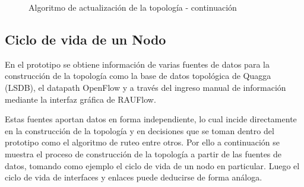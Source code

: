 \newpage
\clearpage
\begin{figure}[ht!]
\begin{algorithm}[H]
 
\end{algorithm}
\caption[]{Algoritmo de actualización de la topolog\'ia - continuaci\'on}
\end{figure}

\subsection{Ciclo de vida de un Nodo}
En el prototipo se obtiene informaci\'on de varias fuentes de datos para la construcci\'on de la topolog\'ia como la base de datos topol\'ogica de Quagga (LSDB), el datapath OpenFlow y a través del ingreso manual de informaci\'on mediante la interfaz gr\'afica de RAUFlow.

Estas fuentes aportan datos en forma independiente, lo cual incide directamente en la construcci\'on de la topolog\'ia y en decisiones que se toman dentro del prototipo como el algoritmo de ruteo entre otros. Por ello a continuaci\'on se muestra el proceso de construcci\'on de la topolog\'ia a partir de las fuentes de datos, tomando como ejemplo el ciclo de vida de un nodo en particular. Luego el ciclo de vida de interfaces y enlaces puede deducirse de forma análoga.\\

